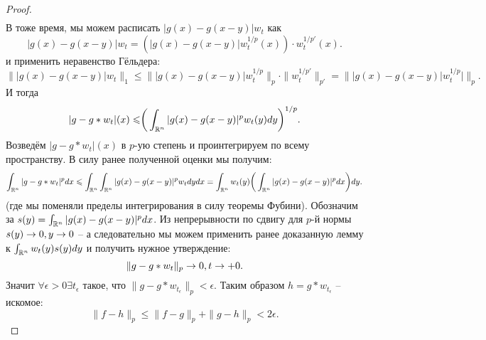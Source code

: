 \begin{proof}
\begin{multline*}
    \end{multline*}
    В тоже время, мы можем расписать $|g(x) - g(x - y)|w_t$ как \[|g(x) - g(x - y)|w_t = (|g(x) - g(x - y)|w_t^{1/p}(x)) \cdot w_t^{1/p'}(x).\]
    и применить неравенство Гёльдера:
    \[
        \||g(x) - g(x - y)|w_t\|_1 \leq \||g(x) - g(x - y)|w_t^{1/p}\|_p \cdot \|w_t^{1/p'}\|_{p'} = \||g(x) - g(x - y)|w_t^{1/p}|\|_p.
    \]
    И тогда
    \[
        |g - g * w_t|(x) \leqslant \biggr( \int_{\mathbb{R}^n}|g(x) - g(x - y)|^p w_t(y)dy \biggr)^{1/p}.
    \]
    Возведём $|g - g * w_t|(x)$ в $p$-ую степень и проинтегрируем по всему пространству.
    В силу ранее полученной оценки мы получим:
    \[
        \int_{\mathbb{R}^n}|g - g * w_t|^p dx \leqslant \int_{\mathbb{R}^n} \int_{\mathbb{R}^n} |g(x) - g(x - y)|^p w_t dy dx = \int_{\mathbb{R}^n} w_t(y) \biggr(\int_{\mathbb{R}^n} |g(x) - g(x - y)|^{p} dx \biggr) dy.
    \]
    (где мы поменяли пределы интегрирования в силу теоремы Фубини).
    Обозначим за $s(y) = \int_{\mathbb{R}^n}|g(x) - g(x - y)|^p dx$.
    Из непрерывности по сдвигу для $p$-й нормы $s(y) \rightarrow 0, y \rightarrow 0$ -- а следовательно мы можем применить ранее доказанную лемму к $\int_{\mathbb{R}^n}w_t(y)s(y)dy$ и получить нужное утверждение:
    \[
        \|g - g * w_t\|_p \rightarrow 0, t \rightarrow +0.
    \]
    Значит $\forall \epsilon > 0 \exists t_{\epsilon}$ такое, что $\|g - g * w_{t_\epsilon}\|_p < \epsilon$.
    Таким образом $h = g * w_{t_\epsilon}$ -- искомое:
    \[
        \|f - h\|_p \leq \|f - g\|_p + \|g - h\|_p < 2\epsilon.
    \]
\end{proof}